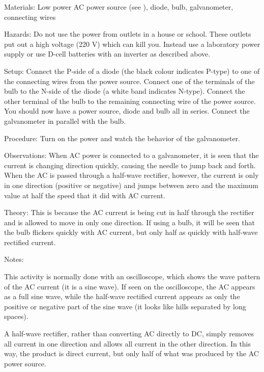 \begin{multicols}{2}
\begin{description*}
\item[Materials:]{Low power AC power source (see ), diode, bulb, galvanometer, connecting wires}
\item[Hazards:]{Do not use the power from outlets in a house or school.  These outlets put out a high voltage (220 V) which can kill you.  Instead use a laboratory power supply or use D-cell batteries with an inverter as described above.}
\item[Setup:]{Connect the P-side of a diode (the black colour indicates P-type) to one of the connecting wires from the power source. Connect one of the terminals of the bulb to the N-side of the diode (a white band indicates N-type). Connect the other terminal of the bulb to the remaining connecting wire of the power source. You should now have a power source, diode and bulb all in series. Connect the galvanometer in parallel with the bulb.}
\item[Procedure:]{Turn on the power and watch the behavior of the galvanometer.}
\item[Observations:]{When AC power is connected to a galvanometer, it is seen that the current is changing direction quickly, causing the needle to jump back and forth.  When the AC is passed through a half-wave rectifier, however, the current is only in one direction (positive or negative) and jumps between zero and the maximum value at half the speed that it did with AC current.}
\item[Theory:]{This is because the AC current is being cut in half through the rectifier and is allowed to move in only one direction.  If using a bulb, it will be seen that the bulb flickers quickly with AC current, but only half as quickly with half-wave rectified current.}
\item[Notes:]{This activity is normally done with an oscilloscope, which shows the wave pattern of the AC current (it is a sine wave).  If seen on the oscilloscope, the AC appears as a full sine wave, while the half-wave rectified current appears as only the positive or negative part of the sine wave (it looks like hills separated by long spaces).

A half-wave rectifier, rather than converting AC directly to DC, simply removes all current in one direction and allows all current in the other direction.  In this way, the product is direct current, but only half of what was produced by the AC power source.}
\end{description*}



\end{multicols}

\pagebreak